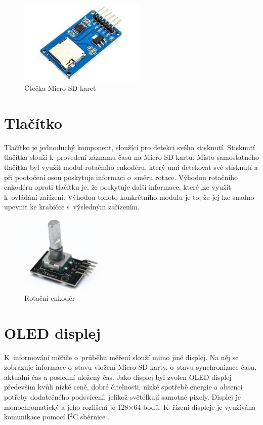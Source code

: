\begin{figure}[H]
	\centering
	\includegraphics[width=6cm]{images/komponenty/ctecka_micro_sd.jpg}
	\caption{Čtečka Micro SD karet \cite{dratek_web}}
\end{figure}

\section{Tlačítko}
Tlačítko je jednoduchý komponent, sloužící pro detekci svého stisknutí. Stisknutí tlačítka slouží k~provedení záznamu času na Micro SD kartu. Místo samostatného tlačítka byl využit modul rotačního enkodéru, který umí detekovat své stisknutí a při pootočení osou poskytuje informaci o~směru rotace. Výhodou rotačního enkodéru oproti tlačítku je, že poskytuje další informace, které lze využít k~ovládání zařízení. Výhodou tohoto konkrétního modulu je to, že jej lze snadno upevnit ke krabičce s~výsledným zařízením.
\begin{figure}[H]
	\centering
	\includegraphics[width=4cm]{images/komponenty/rotacni_enkoder.jpg}
	\caption{Rotační enkodér \cite{dratek_web}}
\end{figure}

\section{OLED displej}
K~informování měřiče o~průběhu měření slouží mimo jiné displej. Na něj se zobrazuje informace o~stavu vložení Micro SD karty, o~stavu synchronizace času, aktuální čas a poslední uložený čas. Jako displej byl zvolen OLED displej především kvůli nízké ceně, dobré čitelnosti, nízké spotřebě energie a absenci potřeby dodatečného podsvícení, jelikož světélkují samotné pixely. Displej je monochromatický a jeho rozlišení je 128×64 bodů. K~řízení displeje je využívána komunikace pomocí I\(^2\)C sběrnice \cite{arduino_navody}.

